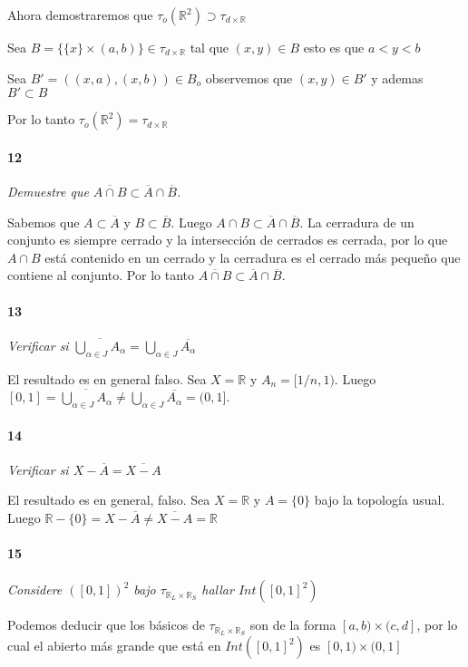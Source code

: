 \documentclass[12pt]{article}
\begin{document}
Ahora demostraremos que $\tau_o(\mathbb{R}^2)\supset  \tau_{d\times \mathbb{R}}$

Sea $B=\{\{x\}\times(a,b)\}\in\tau_{d\times \mathbb{R}}$ tal que $(x,y)\in B$ esto es que $a<y<b$

Sea $B'=((x,a),(x,b))\in B_o$ observemos que $(x,y)\in B'$ y ademas $B'\subset B$ 

Por lo tanto $\tau_o(\mathbb{R}^2)=  \tau_{d\times \mathbb{R}}$

\paragraph{12}
\textit{Demuestre que $\overline{A \cap B} \subset \overline{A} \cap \overline{B}$.}

Sabemos que $A \subset \overline{A}$ y $B \subset \overline{B}$. Luego $A \cap B \subset \overline{A} \cap \overline{B}$. La cerradura de un conjunto es siempre
cerrado y la intersección de cerrados es cerrada, por lo que $A \cap B$ está contenido en un cerrado y la cerradura es el cerrado más pequeño que contiene al conjunto. Por lo tanto
$\overline{A \cap B} \subset \overline{A} \cap \overline{B}$.

\paragraph{13}
\textit{Verificar si $\overline{\bigcup\limits_{\alpha\in J}A_{\alpha}}=\bigcup\limits_{\alpha\in J}\overline{A_{\alpha}}$}

El resultado es en general falso. Sea $X=\mathbb{R}$ y $A_n=[1/n,1)$.
Luego $[0,1]=\overline{\bigcup\limits_{\alpha\in J}A_{\alpha}} \neq \bigcup\limits_{\alpha\in J}\overline{A_{\alpha}} =(0,1]$.
\paragraph{14}
\textit{Verificar si $X-\overline{A}=\overline{X-A}$}

El resultado es en general, falso. Sea $X=\mathbb{R}$ y $A=\{0\}$ bajo la topología usual.
 Luego $\mathbb{R}-\{0\} = X-\overline{A}\neq \overline{X-A} = \mathbb{R}$

\paragraph{15}
\textit{Considere $([0,1])^2$ bajo $\tau_{\mathbb{R}_L\times\mathbb{R}_S}$ hallar $Int([0,1]^2)$}

Podemos deducir que los b\'asicos de $\tau_{\mathbb{R}_L\times\mathbb{R}_S}$
son de la forma $[a, b) \times (c, d]$, por lo cual el abierto m\'as
grande que est\'a en $Int([0,1]^2)$ es $[0, 1) \times (0, 1]$
\end{document}
